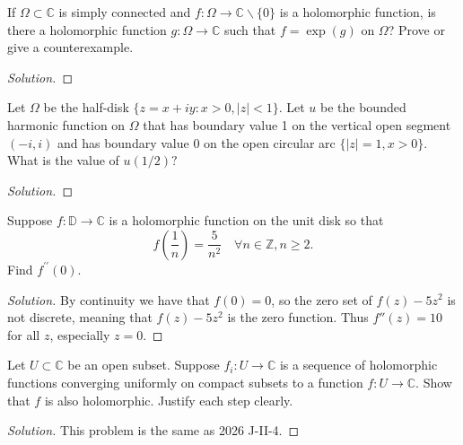 \documentclass[10pt]{article}
\newenvironment{soln}{\begin{proof}[Solution]}{\end{proof}}
\begin{document}
\begin{problem}
[2022 A-I-5]
If $\Omega \subset \mathbb{C}$ is simply connected and $f: \Omega \rightarrow \mathbb{C} \backslash\{0\}$ is a holomorphic function, is there a holomorphic function $g: \Omega \rightarrow \mathbb{C}$ such that $f=\exp (g)$ on $\Omega$? Prove or give a counterexample.
\end{problem}

\begin{soln}

\end{soln}



\begin{problem}
[2022 A-II-3]
Let $\Omega$ be the half-disk $\{z=x+i y: x>0,|z|<1\}$. Let $u$ be the bounded harmonic function on $\Omega$ that has boundary value 1 on the vertical open segment $(-i, i)$ and has boundary value 0 on the open circular arc $\{|z|=1, x>0\}$. What is the value of $u(1 / 2) ?$
\end{problem}

\begin{soln}

\end{soln}



\begin{problem}
[2022 J-I-1]
Suppose $f: \mathbb{D} \longrightarrow \mathbb{C}$ is a holomorphic function on the unit disk so that $$f\left(\frac{1}{n}\right)=\frac{5}{n^2} \quad \forall n \in \mathbb{Z}, n \geq 2.$$ Find $f^{\prime \prime}(0)$.
\end{problem}

\begin{soln}
    By continuity we have that $f(0) = 0$,
    so the zero set of $f(z) - 5z^2$ is not discrete,
    meaning that $f(z) - 5z^2$ is the zero function.
    Thus $f''(z) = 10$ for all $z$, especially $z = 0$.
\end{soln}



\begin{problem}
[2022 J-II-4]
Let $U \subset \mathbb{C}$ be an open subset. Suppose $f_i: U \longrightarrow \mathbb{C}$ is a sequence of holomorphic functions converging uniformly on compact subsets to a function $f: U \longrightarrow \mathbb{C}$. Show that $f$ is also holomorphic. Justify each step clearly.
\end{problem}

\begin{soln}
    This problem is the same as 2026 J-II-4.
\end{soln}
\end{document}
